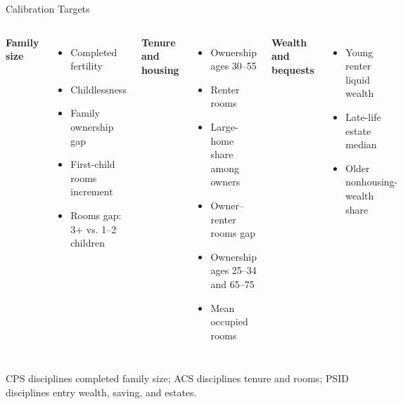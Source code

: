 \documentclass[aspectratio=169,11pt]{beamer}
\newcommand{\1}{\mathbf 1}
\begin{document}
\begin{frame}{Calibration Targets}
  \small
  \begin{columns}[T,onlytextwidth]
      \textbf{Family size}
      \begin{itemize}\setlength{\itemsep}{0.3em}
        \item Completed fertility
        \item Childlessness
        \item Family ownership gap
        \item First-child rooms increment
        \item Rooms gap: 3+ vs. 1--2 children
      \end{itemize}
      \textbf{Tenure and housing}
      \begin{itemize}\setlength{\itemsep}{0.3em}
        \item Ownership ages 30--55
        \item Renter rooms
        \item Large-home share among owners
        \item Owner--renter rooms gap
        \item Ownership ages 25--34 and 65--75
        \item Mean occupied rooms
      \end{itemize}
      \textbf{Wealth and bequests}
      \begin{itemize}\setlength{\itemsep}{0.3em}
        \item Young renter liquid wealth
        \item Late-life estate median
        \item Older nonhousing-wealth share
      \end{itemize}
  \end{columns}

  \vfill
  CPS disciplines completed family size; ACS disciplines tenure and rooms; PSID disciplines entry wealth, saving, and estates.
\end{frame}
\end{document}
